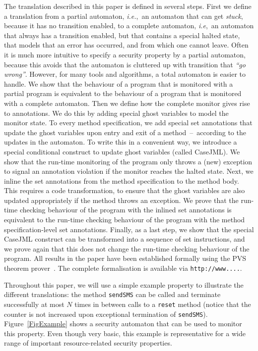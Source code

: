 The translation described in this paper is defined in several
steps. First we define a translation from a partial automaton,
\emph{i.e.},\ an automaton that can get \emph{stuck}, because it has
no transition enabled, to a complete automaton, \emph{i.e},\ an
automaton that always has a transition enabled, but that contains a
special \textsf{halted} state, that models that an error has occurred,
and from which one cannot leave. Often it is much more intuitive to
specify a security property by a partial automaton, because this
avoids that the automaton is cluttered up with transition that
\emph{``go wrong''}. However, for many tools and algorithms, a total
automaton is easier to handle. We show that the behaviour of a program
that is monitored with a partial program is equivalent to the
behaviour of a program that is monitored with a complete
automaton. Then we define how the complete monitor gives rise to
annotations. We do this by adding special ghost variables to model the
monitor state. To every method specification, we add special
\textsf{set} annotations that update the ghost variables upon entry
and exit of a method~--~according to the updates in the automaton. To
write  this in a convenient way, we introduce a special
conditional construct to update ghost variables (called
\textsf{CaseJML}). We show that the run-time monitoring of the program
only throws a (new) exception to signal an annotation violation if the
monitor reaches the \textsf{halted} state. Next, we inline the
\textsf{set} annotations from the method specification to the method
body. This requires a code transformation, to ensure that the ghost
variables are also updated appropriately if the method throws an
exception. We prove that the run-time checking behaviour of the
program with the inlined \textsf{set} annotations is equivalent to the
run-time checking behaviour of the program with the method
specification-level \textsf{set} annotations. Finally, as a last step,
we show that the special \textsf{CaseJML} construct can be transformed
into a sequence of set instructions, and we prove again that this does
not change the run-time checking behaviour of the program. All results
in the paper have been established formally using the PVS theorem
prover~\cite{OwreRRSS96}. The complete formalisation is available via 
\texttt{http://www....}. 

Throughout this paper, we will use a simple example property to
illustrate the different translations: the method \texttt{sendSMS} can
be called and terminate successfully at most \(N\) times in between
calls to a \texttt{reset} method (notice that the counter is not
increased upon exceptional termination of
\texttt{sendSMS}). Figure~\ref{FigExample} shows a security automaton
that can be used to monitor this property. Even though very basic,
this example is representative for a wide range of important
resource-related security properties.

